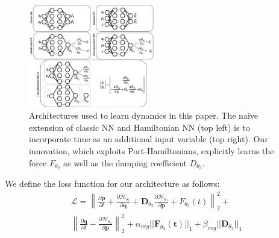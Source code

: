 \documentclass[twoside]{article}
\begin{document}
\begin{figure}[h!]
\centering
\includegraphics[width=0.5\textwidth]{figures/architect.png}
\caption{Architectures used to learn dynamics in this paper. The naive extension of classic NN and Hamiltonian NN (top left) is to incorporate time as an additional input variable (top right). Our innovation, which exploits Port-Hamiltonians, explicitly learns the force $F_{\theta_2}$ as well as the damping coefficient $D_{\theta_3}$.}
\label{fig.architecture}
\end{figure}

We define the loss function for our architecture as follows:
\begin{multline}
\mathcal{L} =\left\| \frac{\partial \mathbf{p}}{\partial t} +\frac{\partial \mathcal{H}_{\theta_1}}{\partial \mathbf{q}} +\mathbf{D}_{\theta_2}\frac{\partial \mathcal{H}_{\theta_1}}{\partial \mathbf{p}} + F_{\theta_3}(t) \right\|_2^2 +
\\
\left\|\frac{\partial \mathbf{q}}{\partial t} - \frac{\partial \mathcal{H}_{\theta_1}}{\partial \mathbf{p}} \right\|_2^2+ \alpha_{reg}|| \mathbf{F}_{\theta_3} (\mathbf{t})||_1 + \beta_{reg}||\mathbf{D}_{\theta_2}||_1 
\end{multline}
\end{document}
